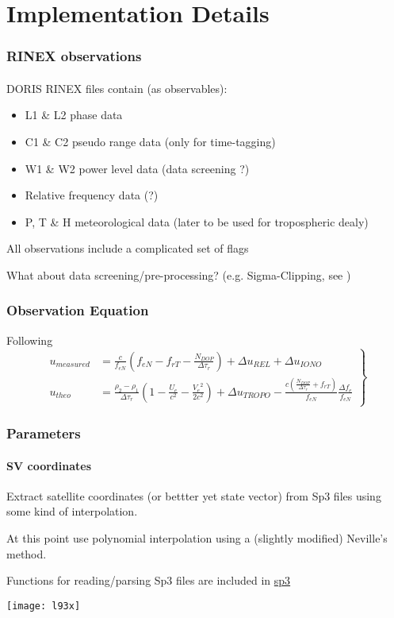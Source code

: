 \documentclass{beamer}
\begin{document}
\section{Implementation Details}

\begin{frame}\frametitle{RINEX observations}\framesubtitle{}
  DORIS RINEX files contain (as observables):
  \begin{itemize}
    \item L1 \& L2 phase data
    \item C1 \& C2 pseudo range data (only for time-tagging)
    \item W1 \& W2 power level data (data screening ?)
    \item Relative frequency data (?)
    \item P, T \& H meteorological data (later to be used for tropospheric dealy)
  \end{itemize}
  \vspace{.2cm}

  All observations include a complicated set of flags\\
  \vspace{.2cm}

  What about data screening/pre-processing? (e.g. Sigma-Clipping, see \citep{Ramanathan})
\end{frame}

\begin{frame}\frametitle{Observation Equation}
  Following \cite{lemoine-2016}
  \begin{equation}
    \label{eq:lem13}
    \left.\begin{aligned}
        u_{measured} & = \frac{c}{f_{eN}} (f_{eN} - f_{rT} -
         \frac{N_{DOP}}{\Delta\tau_r}) + \Delta u_{REL} + \Delta u_{IONO}\\
        u_{theo} &= \frac{\rho_2 - \rho_1}{\Delta\tau_r} (1- \frac{U_e}{c^2} - \frac{{V_e}^2}{2 c^2}) + \Delta u_{TROPO} - \frac{c(\frac{N_{DOP}}{\Delta\tau_r} + f_{rT})}{f_{eN}} \frac{\Delta f_e}{f_{eN}}
    \end{aligned}
\right\}
\end{equation}
\end{frame}

\begin{frame}\frametitle{Parameters}\framesubtitle{SV coordinates}
    Extract satellite coordinates (or bettter yet state vector) from Sp3 files 
    using some kind of interpolation.\\
    \vspace{.2cm}
    
    At this point use polynomial interpolation using a (slightly modified) Neville's \citet{numrec3}
    method.\\
    \vspace{.2cm}
    
    Functions for reading/parsing Sp3 files are included in \href{https://github.com/xanthospap/sp3}{sp3}

    \texttt{[image: l93x]}
\end{frame}
\end{document}
